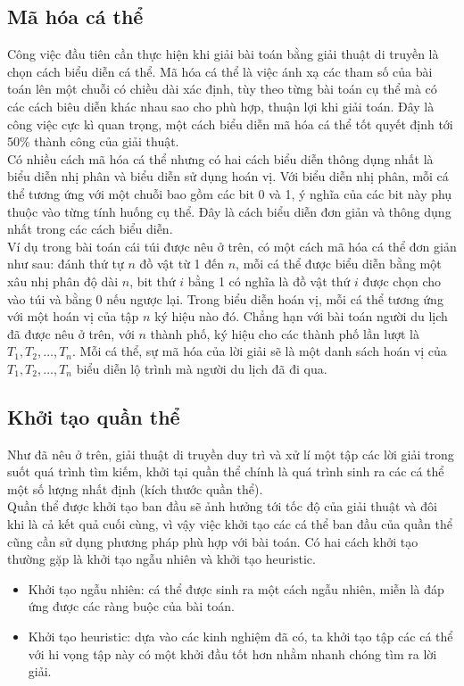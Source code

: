 \subsection{Mã hóa cá thể}
Công việc đầu tiên cần thực hiện khi giải bài toán bằng giải thuật di truyền là chọn cách biểu diễn cá thể. Mã hóa cá thể là việc ánh xạ các tham số của bài toán lên một chuỗi có chiều dài xác định, tùy theo từng bài toán cụ thể mà có các cách biêu diễn khác nhau sao cho phù hợp, thuận lợi khi giải toán. Đây là công việc cực kì quan trọng, một cách biểu diễn mã hóa cá thể tốt quyết định tới 50\% thành công của giải thuật.
\\Có nhiều cách mã hóa cá thể nhưng có hai cách biểu diễn thông dụng nhất là biểu diễn nhị phân và biểu diễn sử dụng hoán vị.
Với biểu diễn nhị phân, mỗi cá thể tương ứng với một chuỗi bao gồm các bit 0 và 1, ý nghĩa của các bit này phụ thuộc vào từng tính huống cụ thể. Đây là cách biểu diễn đơn giản và thông dụng nhất trong các cách biểu diễn.
\\Ví dụ trong bài toán cái túi được nêu ở trên, có một cách mã hóa cá thể đơn giản như sau: đánh thứ tự $n$ đồ vật từ 1 đến $n$, mỗi cá thể được biểu diễn bằng một xâu nhị phân độ dài $n$, bit thứ $i$ bằng 1 có nghĩa là đồ vật thứ $i$ được chọn cho vào túi và bằng 0 nếu ngược lại.
Trong biểu diễn hoán vị, mỗi cá thể tương ứng với một hoán vị của tập $n$ ký hiệu nào đó. Chẳng hạn với bài toán người du lịch đã được nêu ở trên, với $n$ thành phố, ký hiệu cho các thành phố lần lượt là $T_1, T_2, …, T_n$. Mỗi cá thể, sự mã hóa của lời giải sẽ là một danh sách hoán vị của $T_1, T_2, …, T_n$ biểu diễn lộ trình mà người du lịch đã đi qua. 
\subsection{Khởi tạo quần thể }
Như đã nêu ở trên, giải thuật di truyền duy trì và xử lí một tập các lời giải trong suốt quá trình tìm kiếm, khởi tại quần thể chính là quá trình sinh ra các cá thể một số lượng nhất định (kích thước quần thể).
\\Quần thể được khởi tạo ban đầu sẽ ảnh hưởng tới tốc độ của giải thuật và đôi khi là cả kết quả cuối cùng, vì vậy việc khởi tạo các cá thể ban đầu của quần thể cũng cần sử dụng phương pháp phù hợp với bài toán. Có hai cách khởi tạo thường gặp là khởi tạo ngẫu nhiên và khởi tạo heuristic.
\begin{itemize}
    \item Khởi tạo ngẫu nhiên: cá thể được sinh ra một cách ngẫu nhiên, miễn là đáp ứng được các ràng buộc của bài toán.
    \item Khởi tạo heuristic: dựa vào các kinh nghiệm đã có, ta khởi tạo tập các cá thể với hi vọng tập này có một khởi đầu tốt hơn nhằm nhanh chóng tìm ra lời giải.    
\end{itemize}
